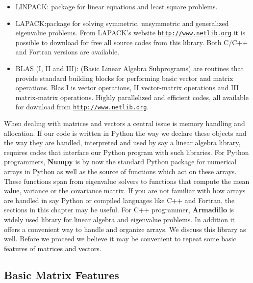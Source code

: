 \documentclass[%
oneside,                 %
final,                   %
10pt]{article}
\begin{document}
\begin{itemize}
  \item LINPACK: package for linear equations and least square problems.

  \item LAPACK:package for solving symmetric, unsymmetric and generalized eigenvalue problems. From LAPACK's website \href{{http://www.netlib.org}}{\nolinkurl{http://www.netlib.org}} it is possible to download for free all source codes from this library. Both C/C++ and Fortran versions are available.

  \item BLAS (I, II and III): (Basic Linear Algebra Subprograms) are routines that provide standard building blocks for performing basic vector and matrix operations. Blas I is vector operations, II vector-matrix operations and III matrix-matrix operations. Highly parallelized and efficient codes, all available for download from \href{{http://www.netlib.org}}{\nolinkurl{http://www.netlib.org}}.
\end{itemize}

\noindent
When dealing with matrices and vectors a central issue is memory
handling and allocation. If our code is written in Python the way we
declare these objects and the way they are handled, interpreted and
used by say a linear algebra library, requires codes that interface
our Python program with such libraries. For Python programmers,
\textbf{Numpy} is by now the standard Python package for numerical arrays in
Python as well as the source of functions which act on these
arrays. These functions span from eigenvalue solvers to functions that
compute the mean value, variance or the covariance matrix. If you are
not familiar with how arrays are handled in say Python or compiled
languages like C++ and Fortran, the sections in this chapter may be
useful. For C++ programmer, \textbf{Armadillo} is widely used library for
linear algebra and eigenvalue problems. In addition it offers a
convenient way to handle and organize arrays. We discuss this library
as well.   Before we proceed we believe  it may be convenient to repeat some basic features of 
 matrices and vectors.


\subsection*{Basic Matrix Features}


\end{document}
